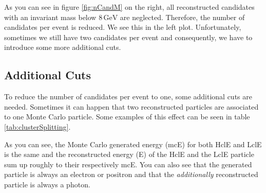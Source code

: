 \documentclass[a4paper,11pt,twosided,final,german,openbib,pdftex,listof=totoc,bibliography=totoc]{scrbook}
\begin{document}
As you can see in figure \ref{fig:nCandM} on the right, all reconstructed candidates with an invariant mass below $8\,\textrm{GeV}$ are neglected. Therefore, the number of candidates per event is reduced. We see this in the left plot. Unfortunately, sometimes we still have two candidates per event and consequently, we have to introduce some more additional cuts.



\subsection{Additional Cuts}

To reduce the number of candidates per event to one, some additional cuts are needed. Sometimes it can happen that two reconstructed particles are associated to one Monte Carlo particle. Some examples of this effect can be seen in table \ref{tab:clusterSplitting}. 


\begin{table}[h!]
	\centering
	\caption[Cluster Splitting Examples]{Some examples for events with cluster splitting. mcE is the same for LclE and HclE. The energies are in GeV. }
	\label{tab:clusterSplitting}
\end{table}




As you can see, the Monte Carlo generated energy (mcE) for both HclE and LclE is the same and the reconstructed energy (E) of the HclE and the LclE particle sum up roughly to their respectively mcE. You can also see that the generated particle is always an electron or positron and that the \textit{additionally} reconstructed particle is always a photon.
\end{document}
